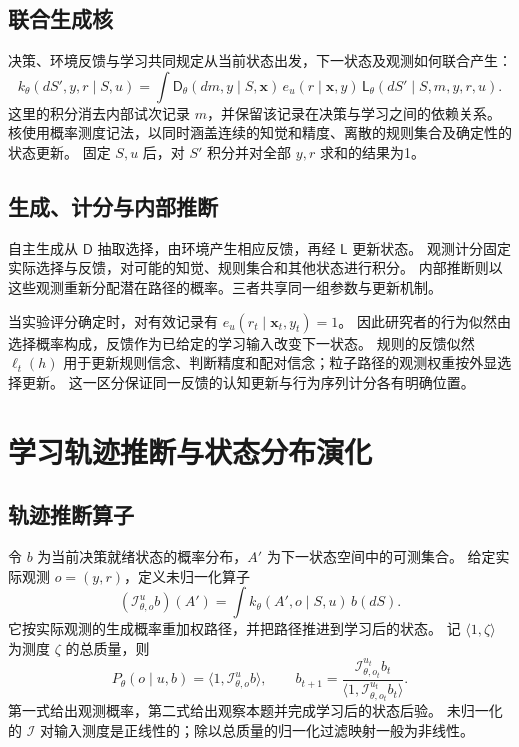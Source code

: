 \documentclass[11pt,a4paper]{article}
\numberwithin{equation}{section}
\newcommand{\Dd}{\mathsf{D}}
\newcommand{\Ll}{\mathsf{L}}
\newcommand{\Ii}{\mathcal{I}}
\begin{document}
\subsection{联合生成核}
决策、环境反馈与学习共同规定从当前状态出发，下一状态及观测如何联合产生：
\begin{equation}
k_\theta(dS',y,r\mid S,u)=
\int \Dd_\theta(dm,y\mid S,\bm x)\,
e_u(r\mid\bm x,y)\,
\Ll_\theta(dS'\mid S,m,y,r,u).
\label{eq:kernel}
\end{equation}
这里的积分消去内部试次记录 $m$，并保留该记录在决策与学习之间的依赖关系。
核使用概率测度记法，以同时涵盖连续的知觉和精度、离散的规则集合及确定性的状态更新。
固定 $S,u$ 后，对 $S'$ 积分并对全部 $y,r$ 求和的结果为1。

\subsection{生成、计分与内部推断}
自主生成从 $\Dd$ 抽取选择，由环境产生相应反馈，再经 $\Ll$ 更新状态。
观测计分固定实际选择与反馈，对可能的知觉、规则集合和其他状态进行积分。
内部推断则以这些观测重新分配潜在路径的概率。三者共享同一组参数与更新机制。

当实验评分确定时，对有效记录有 $e_u(r_t\mid\bm x_t,y_t)=1$。
因此研究者的行为似然由选择概率构成，反馈作为已给定的学习输入改变下一状态。
规则的反馈似然 $\ell_t(h)$ 用于更新规则信念、判断精度和配对信念；粒子路径的观测权重按外显选择更新。
这一区分保证同一反馈的认知更新与行为序列计分各有明确位置。

\section{学习轨迹推断与状态分布演化}
\label{sec:operators}

\subsection{轨迹推断算子}
令 $b$ 为当前决策就绪状态的概率分布，$A'$ 为下一状态空间中的可测集合。
给定实际观测 $o=(y,r)$，定义未归一化算子
\begin{equation}
(\Ii_{\theta,o}^{u}b)(A')=\int k_\theta(A',o\mid S,u)\,b(dS).
\label{eq:inference}
\end{equation}
它按实际观测的生成概率重加权路径，并把路径推进到学习后的状态。
记 $\langle1,\zeta\rangle$ 为测度 $\zeta$ 的总质量，则
\begin{equation}
P_\theta(o\mid u,b)=\langle1,\Ii_{\theta,o}^{u}b\rangle,\qquad
b_{t+1}=\frac{\Ii_{\theta,o_t}^{u_t}b_t}
{\langle1,\Ii_{\theta,o_t}^{u_t}b_t\rangle}.
\label{eq:filter}
\end{equation}
第一式给出观测概率，第二式给出观察本题并完成学习后的状态后验。
未归一化的 $\Ii$ 对输入测度是正线性的；除以总质量的归一化过滤映射一般为非线性。
\end{document}
